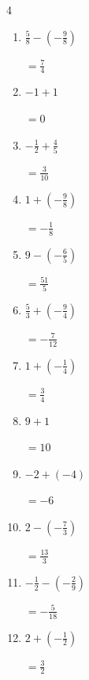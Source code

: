 \begin{multicols}{4}
\begin{enumerate}
        $\displaystyle =-\frac{9}{2}$

  \item $\displaystyle \frac{5}{8} - \left(-\frac{9}{8}\right)$

        $\displaystyle =\frac{7}{4}$

  \item $\displaystyle -1 + 1$

        $\displaystyle =0$

  \item $\displaystyle -\frac{1}{2} + \frac{4}{5}$

        $\displaystyle =\frac{3}{10}$

  \item $\displaystyle 1 + \left(-\frac{9}{8}\right)$

        $\displaystyle =-\frac{1}{8}$

  \item $\displaystyle 9 - \left(-\frac{6}{5}\right)$

        $\displaystyle =\frac{51}{5}$

  \item $\displaystyle \frac{5}{3} + \left(-\frac{9}{4}\right)$

        $\displaystyle =-\frac{7}{12}$

\columnbreak %

  \item $\displaystyle 1 + \left(-\frac{1}{4}\right)$

        $\displaystyle =\frac{3}{4}$

  \item $\displaystyle 9 + 1$

        $\displaystyle =10$

  \item $\displaystyle -2 + \left(-4\right)$

        $\displaystyle =-6$

  \item $\displaystyle 2 - \left(-\frac{7}{3}\right)$

        $\displaystyle =\frac{13}{3}$

  \item $\displaystyle -\frac{1}{2} - \left(-\frac{2}{9}\right)$

        $\displaystyle =-\frac{5}{18}$

  \item $\displaystyle 2 + \left(-\frac{1}{2}\right)$

        $\displaystyle =\frac{3}{2}$


\end{enumerate}
\end{multicols}
